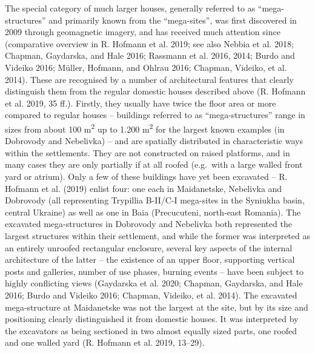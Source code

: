 \documentclass[
  12pt,
  a4paper, twoside]{book}
\begin{document}
The special category of much larger houses, generally referred to as ``mega-structures'' and primarily known from the ``mega-sites'', was first discovered in 2009 through geomagnetic imagery, and has received much attention since (comparative overview in R. Hofmann et al. 2019; see also Nebbia et al. 2018; Chapman, Gaydarska, and Hale 2016; Rassmann et al. 2016, 2014; Burdo and Videiko 2016; Müller, Hofmann, and Ohlrau 2016; Chapman, Videiko, et al. 2014). These are recognised by a number of architectural features that clearly distinguish them from the regular domestic houses described above (R. Hofmann et al. 2019, 35 ff.). Firstly, they usually have twice the floor area or more compared to regular houses -- buildings referred to as ``mega-structures'' range in sizes from about 100 m\textsuperscript{2} up to 1.200 m\textsuperscript{2} for the largest known examples (in Dobrovody and Nebelivka) -- and are spatially distributed in characteristic ways within the settlements. They are not constructed on raised platforms, and in many cases they are only partially if at all roofed (e.g.~with a large walled front yard or atrium). Only a few of these buildings have yet been excavated -- R. Hofmann et al. (2019) enlist four: one each in Maidanetske, Nebelivka and Dobrovody (all representing Trypillia B-II/C-I mega-sites in the Syniukha basin, central Ukraine) as well as one in Baia (Precucuteni, north-east Romania). The excavated mega-structures in Dobrovody and Nebelivka both represented the largest structures within their settlement, and while the former was interpreted as an entirely unroofed rectangular enclosure, several key aspects of the internal architecture of the latter -- the existence of an upper floor, supporting vertical posts and galleries, number of use phases, burning events -- have been subject to highly conflicting views (Gaydarska et al. 2020; Chapman, Gaydarska, and Hale 2016; Burdo and Videiko 2016; Chapman, Videiko, et al. 2014). The excavated mega-structure at Maidanetske was not the largest at the site, but by its size and positioning clearly distinguished it from domestic houses. It was interpreted by the excavators as being sectioned in two almost equally sized parts, one roofed and one walled yard (R. Hofmann et al. 2019, 13--29).
\end{document}
